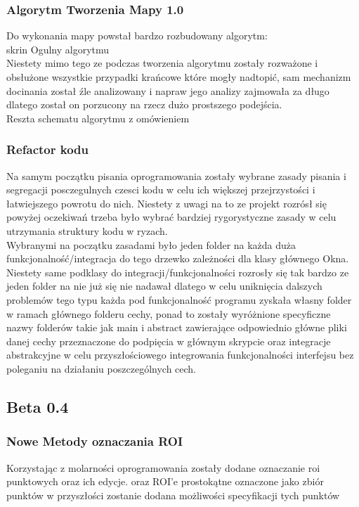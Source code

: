 \documentclass[11pt,a4paper]{article}
\begin{document}
    \subsubsection{Algorytm Tworzenia Mapy 1.0}
    \hspace{1cm} Do wykonania mapy powstał bardzo rozbudowany algorytm:\\
    {\color{red} skrin Ogulny algorytmu}\\
    Niestety mimo tego ze podczas tworzenia algorytmu zostały rozważone i obsłużone wszystkie przypadki krańcowe które mogły nadtopić, sam mechanizm docinania został źle analizowany i napraw jego analizy zajmowała za długo dlatego został on porzucony na rzecz dużo prostszego podejścia.\\
    {\color{red} Reszta schematu algorytmu z omówieniem}\\

    \subsubsection{Refactor kodu}
    \hspace{1cm} Na samym początku pisania oprogramowania zostały wybrane zasady pisania i segregacji posczegulnych czesci kodu w celu ich większej przejrzystości i łatwiejszego powrotu do nich. Niestety z uwagi na to ze projekt rozrósł się powyżej oczekiwań trzeba było wybrać bardziej rygorystyczne zasady w celu utrzymania struktury kodu w ryzach.\\
    \hspace{1cm} Wybranymi na początku zasadami było jeden folder na każda duża funkcjonalność/integracja do tego drzewko zależności dla klasy głównego Okna. Niestety same podklasy do integracji/funkcjonalności rozrosły się tak bardzo ze jeden folder na nie już się nie nadawał dlatego w celu uniknięcia dalszych problemów tego typu każda pod funkcjonalność programu zyskała własny folder w ramach głównego folderu cechy, ponad to zostały wyróżnione specyficzne nazwy folderów takie jak main i abstract zawierające odpowiednio główne pliki danej cechy przeznaczone do podpięcia w głównym skrypcie oraz integracje abstrakcyjne w celu przyszłościowego integrowania funkcjonalności interfejsu bez poleganiu na działaniu poszczególnych cech.

    \subsection{Beta 0.4}

    \subsubsection{Nowe Metody oznaczania ROI}
    \hspace{1cm} Korzystając z molarności oprogramowania zostały dodane oznaczanie roi punktowych oraz ich edycje. oraz ROI'e prostokątne oznaczone jako zbiór punktów w przyszłości zostanie dodana możliwości specyfikacji tych punktów \\
\end{document}
